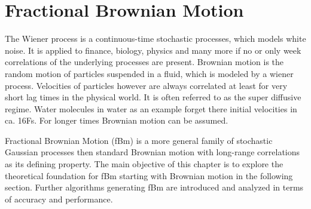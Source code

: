 \documentclass[
  a4paper,BCOR10mm,oneside,
  headsepline,footsepline,%
  fleqn,openbib
]{scrbook}
\begin{document}
\chapter{Fractional Brownian Motion}
The Wiener process is a continuous-time stochastic processes, which models white noise. It is applied to finance, biology, physics and many more if no or only week correlations of the underlying processes are present. Brownian motion is the random motion of particles suspended in a fluid, which is modeled by a wiener process. Velocities of particles however are always correlated at least for very short lag times in the physical world. It is often referred to as the super diffusive regime. Water molecules in water as an example forget there initial velocities in ca. 16Fs. For longer times Brownian motion can be assumed.\par
Fractional Brownian Motion (fBm) is a more general family of stochastic Gaussian processes then standard Brownian motion with long-range correlations as its defining property. The main objective of this chapter is to explore the theoretical foundation for fBm starting with Brownian motion in the following section. Further algorithms generating fBm are introduced and analyzed in terms of accuracy and performance.    
\end{document}
